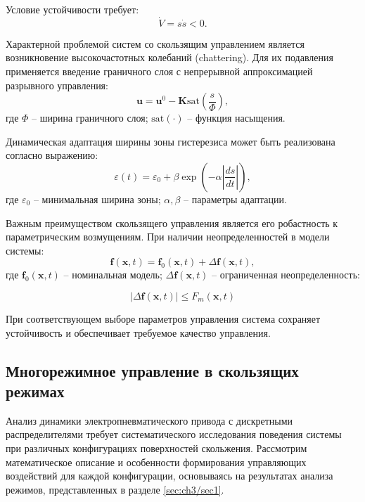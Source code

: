 Условие устойчивости требует:
\begin{equation}
	\dot{V} = s\dot{s} < 0.
\end{equation}

Характерной проблемой систем со скользящим управлением является возникновение высокочастотных колебаний
(chattering). Для их подавления применяется введение граничного слоя с непрерывной аппроксимацией разрывного управления:
\begin{equation}
	\mathbf{u} = \mathbf{u}^0 - \mathbf{K}\text{sat}\left(\frac{s}{\Phi}\right),
\end{equation}
где $\Phi$ -- ширина граничного слоя; $\text{sat}(\cdot)$ -- функция насыщения.

Динамическая адаптация ширины зоны гистерезиса может быть реализована согласно выражению:
\begin{equation}
	\varepsilon(t) = \varepsilon_0 + \beta\exp\left(-\alpha\left|\frac{ds}{dt}\right|\right),
\end{equation}
где $\varepsilon_0$ -- минимальная ширина зоны; $\alpha, \beta$ -- параметры адаптации.

Важным преимуществом скользящего управления является его робастность к
параметрическим возмущениям. При наличии неопределенностей в модели системы:
\begin{equation}
	\mathbf{f}(\mathbf{x}, t) = \mathbf{f}_0(\mathbf{x}, t) + \Delta\mathbf{f}(\mathbf{x}, t),
\end{equation}
где $\mathbf{f}_0(\mathbf{x}, t)$ -- номинальная модель;
$\Delta\mathbf{f}(\mathbf{x}, t)$ -- ограниченная неопределенность:

\begin{equation}
	|\Delta\mathbf{f}(\mathbf{x}, t)| \leq F_m(\mathbf{x}, t)
\end{equation}

При соответствующем выборе параметров управления система сохраняет устойчивость и обеспечивает требуемое качество управления.

\subsection{Многорежимное управление в скользящих режимах}\label{subsec:ch3/sec3/sub2}

Анализ динамики электропневматического привода с дискретными распределителями требует
систематического исследования поведения системы при различных конфигурациях поверхностей
скольжения. Рассмотрим математическое описание и особенности формирования управляющих
воздействий для каждой конфигурации, основываясь на результатах анализа режимов, представленных в разделе \ref{sec:ch3/sec1}.

